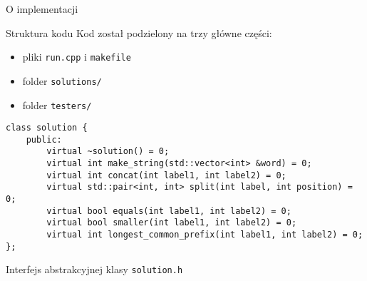 \documentclass[polish]{beamer}
\begin{document}
\begin{frame}[fragile]{O implementacji}
    \begin{block}{Struktura kodu}
        Kod został podzielony na trzy główne części: \pause
        \begin{itemize}
            \item pliki \texttt{run.cpp} i \texttt{makefile} \pause
            \item folder \texttt{solutions/} \pause
            \item folder \texttt{testers/}
        \end{itemize}
    \end{block}
    \pause
    \begin{lrbox}{\thirdbox}
        \begin{lstlisting}[linewidth=18cm]
class solution {
    public:
        virtual ~solution() = 0;
        virtual int make_string(std::vector<int> &word) = 0;
        virtual int concat(int label1, int label2) = 0;
        virtual std::pair<int, int> split(int label, int position) = 0;
        virtual bool equals(int label1, int label2) = 0;
        virtual bool smaller(int label1, int label2) = 0;
        virtual int longest_common_prefix(int label1, int label2) = 0;
};
        \end{lstlisting}
    \end{lrbox}
    \begin{block}{Interfejs abstrakcyjnej klasy \texttt{solution.h}}
    \begin{center}
        \vskip 2mm
        \scalebox{0.6}{\usebox{\thirdbox}}
    \end{center}
    \end{block}
\end{frame}
\end{document}
